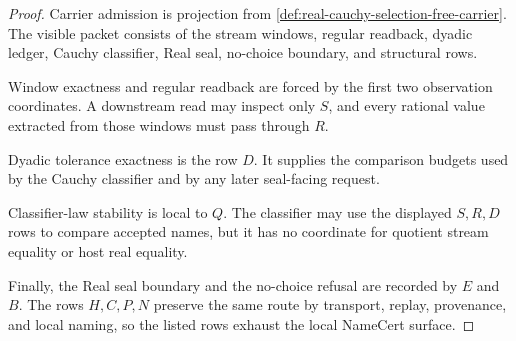 \begin{proof}
Carrier admission is projection from \autoref{def:real-cauchy-selection-free-carrier}. The visible packet consists of the stream windows, regular readback, dyadic ledger, Cauchy classifier, Real seal, no-choice boundary, and structural rows.

Window exactness and regular readback are forced by the first two observation coordinates. A downstream read may inspect only $S$, and every rational value extracted from those windows must pass through $R$.

Dyadic tolerance exactness is the row $D$. It supplies the comparison budgets used by the Cauchy classifier and by any later seal-facing request.

Classifier-law stability is local to $Q$. The classifier may use the displayed $S,R,D$ rows to compare accepted names, but it has no coordinate for quotient stream equality or host real equality.

Finally, the Real seal boundary and the no-choice refusal are recorded by $E$ and $B$. The rows $H,C,P,N$ preserve the same route by transport, replay, provenance, and local naming, so the listed rows exhaust the local NameCert surface.
\end{proof}

